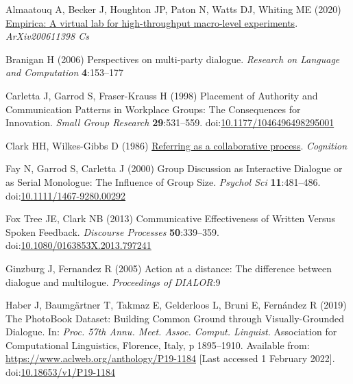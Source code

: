 \documentclass[
  english,
  a4paper,
]{article}
\newlength{\cslhangindent}
\newlength{\cslentryspacingunit} %
\newenvironment{CSLReferences}[2] %
 {%
  \setlength{\parindent}{0pt}
  \ifodd #1
  \let\oldpar\par
  \def\par{\hangindent=\cslhangindent\oldpar}
  \fi
  \setlength{\parskip}{#2\cslentryspacingunit}
 }%
 {}
\begin{document}
\hypertarget{refs}{}
\begin{CSLReferences}{1}{0}
\leavevmode{}%
Almaatouq A, Becker J, Houghton JP, Paton N, Watts DJ, Whiting ME (2020) \href{http://arxiv.org/abs/2006.11398}{Empirica: A virtual lab for high-throughput macro-level experiments}. \emph{ArXiv200611398 Cs}

\leavevmode{}%
Branigan H (2006) Perspectives on multi-party dialogue. \emph{Research on Language and Computation} \textbf{4}:153--177

\leavevmode{}%
Carletta J, Garrod S, Fraser-Krauss H (1998) Placement of {Authority} and {Communication Patterns} in {Workplace Groups}: {The Consequences} for {Innovation}. \emph{Small Group Research} \textbf{29}:531--559. doi:\href{https://doi.org/10.1177/1046496498295001}{10.1177/1046496498295001}

\leavevmode{}%
Clark HH, Wilkes-Gibbs D (1986) \href{http://www.speech.kth.se/~edlund/bielefeld/references/clark-and-wilkes-gibbs-1986.pdf}{Referring as a collaborative process}. \emph{Cognition}

\leavevmode{}%
Fay N, Garrod S, Carletta J (2000) Group {Discussion} as {Interactive Dialogue} or as {Serial Monologue}: {The Influence} of {Group Size}. \emph{Psychol Sci} \textbf{11}:481--486. doi:\href{https://doi.org/10.1111/1467-9280.00292}{10.1111/1467-9280.00292}

\leavevmode{}%
Fox Tree JE, Clark NB (2013) Communicative {Effectiveness} of {Written Versus Spoken Feedback}. \emph{Discourse Processes} \textbf{50}:339--359. doi:\href{https://doi.org/10.1080/0163853X.2013.797241}{10.1080/0163853X.2013.797241}

\leavevmode{}%
Ginzburg J, Fernandez R (2005) Action at a distance: The difference between dialogue and multilogue. \emph{Proceedings of DIALOR}:9

\leavevmode{}%
Haber J, Baumgärtner T, Takmaz E, Gelderloos L, Bruni E, Fernández R (2019) The {PhotoBook Dataset}: {Building Common Ground} through {Visually-Grounded Dialogue}. In: \emph{Proc. 57th {Annu}. {Meet}. {Assoc}. {Comput}. {Linguist}.} {Association for Computational Linguistics}, {Florence, Italy}, p 1895--1910. Available from: \url{https://www.aclweb.org/anthology/P19-1184} {[}Last accessed 1 February 2022{]}. doi:\href{https://doi.org/10.18653/v1/P19-1184}{10.18653/v1/P19-1184}


\end{CSLReferences}
\end{document}
